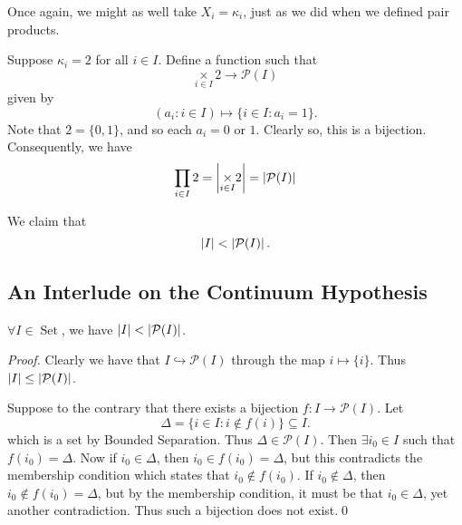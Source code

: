 \documentclass[notoc,notitlepage]{tufte-book}
\DeclareMathOperator{\Set}{Set }
\begin{document}
\begin{remark}
  Once again, we might as well take $X_i = \kappa_i$, just as we did when we defined pair products.
\end{remark}

\begin{eg}
  Suppose $\kappa_i = 2$ for all $i \in I$. Define a function such that
  \begin{equation*}
    \underset{i \in I}{\times} 2 \to \mathcal{P}(I)
  \end{equation*}
  given by
  \begin{equation*}
    (a_i : i \in I) \mapsto \{ i \in I : a_i = 1 \}.
  \end{equation*}
  Note that $2 = \{0, 1\}$, and so each $a_i = 0$ or $1$. Clearly so, this is a bijection. Consequently, we have
  \begin{equation*}
    \prod_{i \in I} 2 = \left| \underset{i \in I}{\times} 2 \right| = \left|\mathcal{P}(I)\right|
  \end{equation*}
\end{eg}

We claim that
\begin{equation*}
  \left|I\right| < \left|\mathcal{P}(I)\right|.
\end{equation*}


\subsection{An Interlude on the Continuum Hypothesis}%
\label{sub:an_interlude_on_the_continuum_hypothesis}

\begin{thm}\label{thm:cantor_s_diagonalization}
  $\forall I \in \Set$, we have $\left|I\right| < \left|\mathcal{P}(I)\right|$.
\end{thm}

\begin{proof}
  Clearly we have that $I \hookrightarrow \mathcal{P}(I)$ through the map $i \mapsto \{i\}$. Thus $\left|I\right| \leq \left|\mathcal{P}(I)\right|$.

  Suppose to the contrary that there exists a bijection $f : I \to \mathcal{P}(I)$. Let
  \begin{equation*}
    \Delta = \{ i \in I : i \notin f(i) \} \subseteq I.
  \end{equation*}
  which is a set by Bounded Separation. Thus $\Delta \in \mathcal{P}(I)$. Then $\exists i_0 \in I$ such that $f(i_0) = \Delta$. Now if $i_0 \in \Delta$, then $i_0 \in f(i_0) = \Delta$, but this contradicts the membership condition which states that $i_0 \notin f(i_0)$. If $i_0 \notin \Delta$, then $i_0 \notin f(i_0) = \Delta$, but by the membership condition, it must be that $i_0 \in \Delta$, yet another contradiction. Thus such a bijection does not exist.\qed\
\end{proof}
\end{document}
